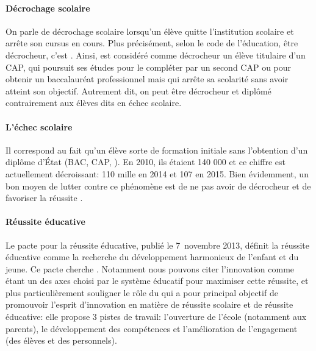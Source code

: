             \paragraph{Décrochage scolaire}
                On parle de décrochage scolaire lorsqu’un élève quitte l’institution scolaire et arrête son cursus en cours. Plus précisément, selon le code de l'éducation, être décrocheur, c'est . Ainsi, est considéré comme décrocheur un élève titulaire d'un CAP, qui poursuit ses études pour le compléter par un second CAP ou pour obtenir un baccalauréat professionnel mais qui arrête sa scolarité sans avoir atteint son objectif. Autrement dit, on peut être décrocheur et diplômé~ contrairement aux élèves dits en échec scolaire.
            \paragraph{L'échec scolaire} 
                Il correspond au fait qu'un élève sorte de formation initiale sans l'obtention d'un diplôme d'État (BAC, CAP, \etc). En 2010, ils étaient 140 000 et ce chiffre est actuellement décroissant: 110 mille en 2014 et 107 en 2015. Bien évidemment, un bon moyen de lutter contre ce phénomène est de ne pas avoir de décrocheur et de favoriser la réussite .
            \paragraph{Réussite éducative}
                Le pacte pour la réussite éducative, publié le 7~novembre 2013, définit la réussite éducative comme la recherche du développement harmonieux de l'enfant et du jeune. Ce pacte cherche . Notamment nous pouvons citer l'innovation comme étant un des axes choisi par le système éducatif pour maximiser cette réussite, et plus particulièrement souligner le rôle du  qui a pour principal objectif de promouvoir l'esprit d'innovation en matière de réussite scolaire et de réussite éducative: elle propose 3 pistes de travail: \Li l'ouverture de l'école (notamment aux parents), \ii le développement des compétences et \iii l'amélioration de l'engagement (des élèves et des personnels).
